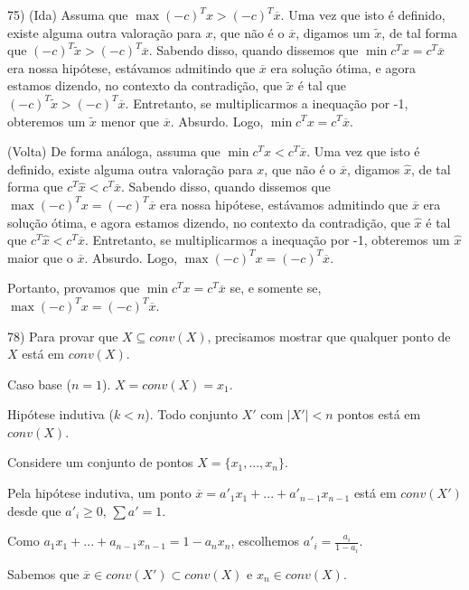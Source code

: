 \documentclass[]{article}
\begin{document}
75) (Ida) Assuma que $\max (-c)^Tx > (-c)^T\overline{x}$. Uma vez que isto é definido, existe alguma outra valoração para $x$, que não é o $\overline{x}$, digamos um $\tilde{x}$, de tal forma que $(-c)^T\tilde{x} > (-c)^T\overline{x}$. Sabendo disso, quando dissemos que $\min c^Tx = c^T\overline{x}$ era nossa hipótese, estávamos admitindo que $\overline{x}$ era solução ótima, e agora estamos dizendo, no contexto da contradição, que $\tilde{x}$ é tal que $(-c)^T\tilde{x} > (-c)^T\overline{x}$. Entretanto, se multiplicarmos a inequação por -1, obteremos um $\tilde{x}$ menor que $\overline{x}$. Absurdo. Logo, $\min c^Tx = c^T\overline{x}$.

\vspace{0.2cm}

(Volta) De forma análoga, assuma que $\min c^Tx < c^T\overline{x}$. Uma vez que isto é definido, existe alguma outra valoração para $x$, que não é o $\overline{x}$, digamos $\hat{x}$, de tal forma que $c^T\hat{x} < c^T\overline{x}$. Sabendo disso, quando dissemos que $\max (-c)^Tx = (-c)^T\overline{x}$ era nossa hipótese, estávamos admitindo que $\overline{x}$ era solução ótima, e agora estamos dizendo, no contexto da contradição, que $\hat{x}$ é tal que $c^T\hat{x} < c^T\overline{x}$. Entretanto, se multiplicarmos a inequação por -1, obteremos um $\hat{x}$ maior que o $\overline{x}$. Absurdo. Logo, $\max (-c)^Tx = (-c)^T\overline{x}$.

\vspace{0.2cm}

Portanto, provamos que $\min c^Tx = c^T\overline{x}$ se, e somente se, $\max (-c)^Tx = (-c)^T\overline{x}$.

\vspace{0.5cm}

78) Para provar que $X \subseteq conv(X)$, precisamos mostrar que qualquer ponto de $X$ está em $conv(X)$.

Caso base ($n=1$). $X = conv(X) = x_1$.

Hipótese indutiva ($k<n$). Todo conjunto $X'$ com $|X'|<n$ pontos está em $conv(X)$.

Considere um conjunto de pontos $X = \{x_1, ..., x_n\}$.

Pela hipótese indutiva, um ponto $\overline{x} = a'_1 x_1 + ... + a'_{n-1} x_{n-1}$ está em $conv(X')$ desde que $a'_i \geq 0$, $\sum a' = 1$.

Como $a_1 x_1 + ... + a_{n-1} x_{n-1} = 1 - a_n x_n$, escolhemos $a'_i = \frac{a_i}{1 - a_i}$.

Sabemos que $\overline{x} \in conv(X') \subset conv(X)$ e $x_n \in conv(X)$.
\end{document}
